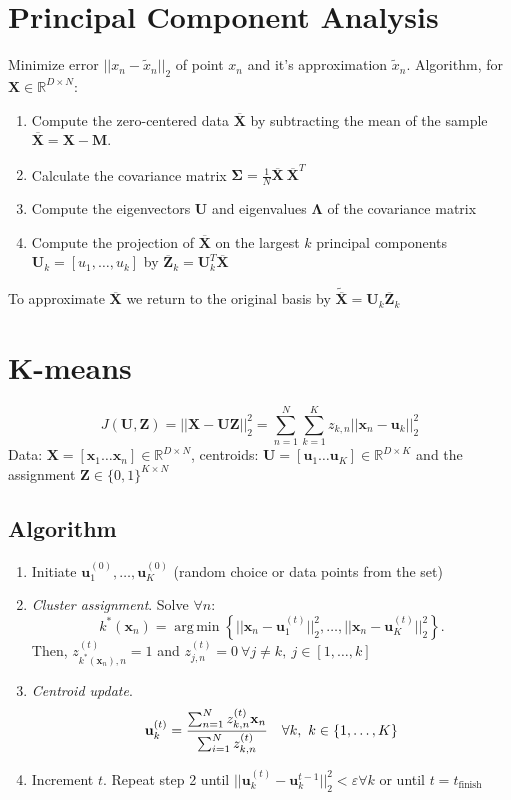 \documentclass[a4paper,11pt,landscape]{article}
\renewcommand{\epsilon}{\varepsilon}
\newcommand{\argmin}{\operatorname*{arg\,min}}
\newcommand{\R}{\mathbb{R}}
\newcommand{\sectionline}{\noindent\makebox[\linewidth]{\rule{\columnwidth}{0.1pt}}}
\newcommand{\msection}[1]{\vspace{-1mm}\sectionline\vspace{-1mm}\section{#1}\vspace{-1mm}}
\begin{document}
\begin{multicols}{3}
\msection{Principal Component Analysis}
Minimize error $||x_n - \tilde x_n||_2$ of point $x_n$ and it's approximation $\tilde x_n$.
Algorithm, for $\mathbf X\in \R^{D\times N}$:
\begin{enumerate}
 \item Compute the zero-centered data $\overline{\mathbf X}$ by subtracting the mean of the sample $\overline{\mathbf X} = \mathbf X - \mathbf M$.
 \item Calculate the covariance matrix $\mathbf \Sigma = \frac{1}{N}\overline{\mathbf X} \ \overline{\mathbf X}^T$
 \item Compute the eigenvectors $\mathbf U$ and eigenvalues $\mathbf \Lambda$ of the covariance matrix
 \item Compute the projection of $\overline{\mathbf X}$ on the largest $k$ principal components $\mathbf U_k = [u_1, \ldots, u_k]$ by $\overline{\mathbf Z}_k = \mathbf U_k^T \overline{\mathbf X}$
\end{enumerate}
To approximate $\overline{\mathbf X}$ we return to the original basis by $\tilde{\overline{\mathbf X}} = \mathbf U_k \overline{\mathbf Z}_k$

\msection{$\mathbf K$-means}
\[
    J(\mathbf U, \mathbf Z) = ||\mathbf X - \mathbf{UZ}||_2^2 = \sum_{n=1}^N \sum_{k=1}^K z_{k,n} ||\mathbf x_n - \mathbf u_k ||_2^2
\]
Data: $\mathbf X = [\mathbf x_1 \ldots \mathbf x_n] \in \R^{D\times N}$, centroids: $\mathbf U = [\mathbf u_1 \ldots \mathbf u_K] \in \R^{D\times K}$ and the assignment $\mathbf Z \in \{0,1\}^{K \times N}$
\subsection{Algorithm}
\begin{enumerate}
 \item Initiate $\mathbf u_1^{(0)}, \ldots, \mathbf u_K^{(0)}$ (random choice or data points from the set)
 \item \emph{Cluster assignment}. Solve $\forall n$:
 \[
  k^*(\mathbf x_n) = \argmin \left\{||\mathbf x_n - \mathbf u_1^{(t)}||_2^2,\ldots, ||\mathbf x_n - \mathbf u_K^{(t)}||_2^2 \right\}.
 \]
 Then, $z_{k^*(\mathbf x_n), n}^{(t)} = 1$ and $z_{j, n}^{(t)} =0\ \forall j\neq k,\ j\in [1,\ldots,k]$
\item \emph{Centroid update}.
\[
 \mathbf u_k^{(t)} = {\sum_{n=1}^N z_{k,n}^{(t)}\mathbf x_n \over \sum_{i=1}^N z_{k,n}^{(t)}}\quad \forall k,\ k \in \{1, \ldots, K\}
\]
\item Increment $t$. Repeat step 2 until $||\mathbf u_k^{(t)} - \mathbf u_k^{t-1}||_2^2 < \epsilon \forall k$ or until $t=t_\text{finish}$


\end{enumerate}
\end{multicols}
\end{document}
